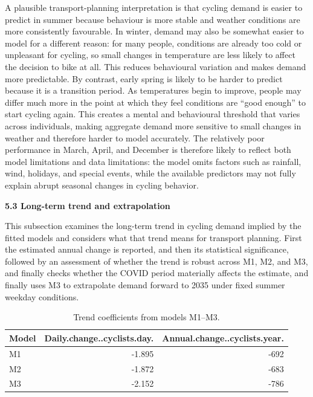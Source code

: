 \documentclass[
]{article}
\begin{document}
A plausible transport-planning interpretation is that cycling demand is easier to predict in summer because behaviour is more stable and weather conditions are more consistently favourable. In winter, demand may also be somewhat easier to model for a different reason: for many people, conditions are already too cold or unpleasant for cycling, so small changes in temperature are less likely to affect the decision to bike at all. This reduces behavioural variation and makes demand more predictable. By contrast, early spring is likely to be harder to predict because it is a transition period. As temperatures begin to improve, people may differ much more in the point at which they feel conditions are ``good enough'' to start cycling again. This creates a mental and behavioural threshold that varies across individuals, making aggregate demand more sensitive to small changes in weather and therefore harder to model accurately. The relatively poor performance in March, April, and December is therefore likely to reflect both model limitations and data limitations: the model omits factors such as rainfall, wind, holidays, and special events, while the available predictors may not fully explain abrupt seasonal changes in cycling behavior.

\textbf{5.3 Long-term trend and extrapolation}

This subsection examines the long-term trend in cycling demand implied by the fitted models and considers what that trend means for transport planning. First the estimated annual change is reported, and then its statistical significance, followed by an assessment of whether the trend is robust across M1, M2, and M3, and finally checks whether the COVID period materially affects the estimate, and finally uses M3 to extrapolate demand forward to 2035 under fixed summer weekday conditions.

\begin{table}

\caption{\label{tab:unnamed-chunk-7}Trend coefficients from models M1--M3.}
\centering
\begin{tabular}[t]{lrr}
\toprule
Model & Daily.change..cyclists.day. & Annual.change..cyclists.year.\\
\midrule
M1 & -1.895 & -692\\
M2 & -1.872 & -683\\
M3 & -2.152 & -786\\
\bottomrule
\end{tabular}
\end{table}
\end{document}
